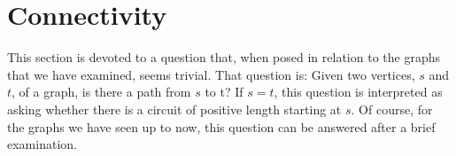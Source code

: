 \documentclass[10pt,]{book}
\theoremstyle{plain}
\theoremstyle{definition}
\theoremstyle{definition}
\theoremstyle{definition}
\theoremstyle{definition}
\theoremstyle{definition}
\numberwithin{equation}{section}
\begin{document}
\section[Connectivity]{Connectivity}\label{s-Connectivity}
\typeout{************************************************}
\typeout{************************************************}
This section is devoted to a question that, when posed in relation to the graphs that we have examined, seems trivial. That question is: Given two
vertices, \(s\) and \(t\), of a graph, is there a path from \(s\) to  t?  If \(s = t\), this question is interpreted
as asking whether there is a circuit of positive length starting at \(s\). Of course, for the graphs we have seen up to now, this question
can be answered after a brief examination.%
\typeout{************************************************}
\typeout{************************************************}
\end{document}
